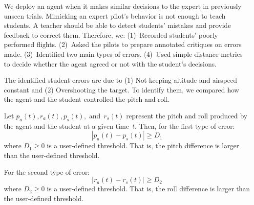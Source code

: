 \documentclass[letterpaper]{article} %
\newcommand{\MET}[1]{\textcolor{blue}{MET: #1}}
\begin{document}
We deploy an agent when it makes similar decisions to the expert in previously unseen trials. Mimicking an expert pilot's behavior is not enough to teach students. A teacher should be able to detect students' mistakes and provide feedback to correct them. Therefore, we: (1)~Recorded students' poorly performed flights. (2)~Asked the pilots to prepare annotated critiques on errors made. (3)~Identified two main types of errors. (4)~Used simple distance metrics to decide whether the agent agreed or not with the student's decisions.

The identified student errors are due to (1) Not keeping altitude and airspeed constant and (2) Overshooting the target. To identify them, we compared how the agent and the student controlled the pitch and roll.  

Let $p_a(t), r_a(t), p_s(t),$ and~$r_s(t)$ represent the pitch and roll produced by the agent and the student at a given time~$t$. Then, for the first type of error:
\begin{equation}
  |p_a(t) - p_s(t)| \ge D_1  
  \label{eq_error1}
\end{equation}
where $D_1 \ge 0$ is a user-defined threshold. That is, the pitch difference is larger than the user-defined threshold. 

For the second type of error:
\begin{equation}
    |r_a(t) - r_s(t)| \ge D_2
    \label{eq_error2}
\end{equation}
where $D_2 \ge 0$ is a user-defined threshold. That is, the roll difference is larger than the user-defined threshold.
\end{document}
